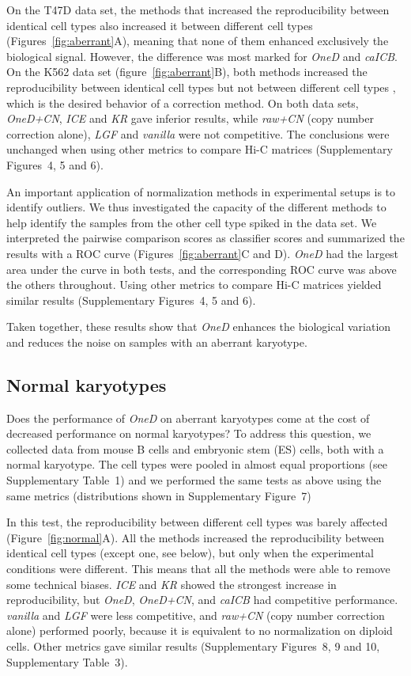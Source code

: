 \documentclass[a4,center,fleqn]{NAR}
\begin{document}
On the T47D data set, the methods that increased the reproducibility
between identical cell types also increased it between different cell
types (Figures~\ref{fig:aberrant}A), meaning that none of them enhanced
exclusively the biological signal. However, the difference was most marked
for \textit{OneD} and \textit{caICB}. On the K562 data set
(figure~\ref{fig:aberrant}B), both methods increased the reproducibility
between identical cell types but not between different cell types
, which is the desired behavior of a
correction method. On both data sets, \textit{OneD+CN}, \textit{ICE} and
\textit{KR} gave inferior results, while \textit{raw+CN} (copy number
correction alone), \textit{LGF} and \textit{vanilla} were not competitive.
The conclusions were unchanged when using other metrics to compare Hi-C
matrices (Supplementary Figures~4, 5 and 6).

An important application of normalization methods in experimental setups
is to identify outliers. We thus investigated the capacity of the
different methods to help identify the samples from the other cell type
spiked in the data set. We interpreted the pairwise comparison scores as
classifier scores and summarized the results with a ROC curve
(Figures~\ref{fig:aberrant}C and D). \textit{OneD} had the largest area
under the curve in both tests, and the corresponding ROC curve was above
the others throughout. Using other metrics to compare Hi-C matrices
yielded similar results (Supplementary Figures~4, 5 and 6).

Taken together, these results show that \textit{OneD} enhances the
biological variation and reduces the noise on samples with an aberrant
karyotype.




\subsection{Normal karyotypes}

Does the performance of \textit{OneD} on aberrant karyotypes come at the
cost of decreased performance on normal karyotypes? To address this
question, we collected data from mouse B cells and embryonic stem (ES)
cells, both with a normal karyotype. The cell types were pooled in almost
equal proportions (see Supplementary Table~1) and we performed the same
tests as above using the same metrics (distributions shown in
Supplementary Figure~7)

In this test, the reproducibility between different cell types was barely
affected (Figure~\ref{fig:normal}A). All the methods increased the
reproducibility between identical cell types (except one, see below), but
only when the experimental conditions were different. This means that all
the methods were able to remove some technical biases. \textit{ICE} and
\textit{KR} showed the strongest increase in reproducibility, but
\textit{OneD}, \textit{OneD+CN}, and \textit{caICB} had competitive
performance. \textit{vanilla} and \textit{LGF} were less competitive, and
\textit{raw+CN} (copy number correction alone) performed poorly, because
it is equivalent to no normalization on diploid cells. Other metrics gave
similar results (Supplementary Figures~8, 9 and 10, Supplementary Table~3).
\end{document}
